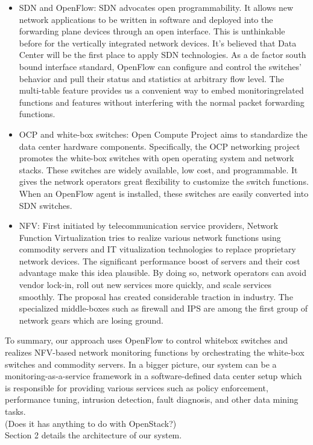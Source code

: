 \documentclass{acm_proc_article-sp}
\begin{document}
\begin{itemize}
\item SDN and OpenFlow\cite{openflow}: SDN advocates open programmability. It allows new network applications to be written in software and deployed into the forwarding plane devices through an open interface. This is unthinkable before for the vertically integrated network devices. It’s believed that Data Center will be the first place to apply SDN technologies. As a de factor south bound interface standard, OpenFlow can configure and control the switches’ behavior and pull their status and statistics at arbitrary flow level. The multi-table feature provides us a convenient way to embed monitoringrelated functions and features without interfering with the normal packet forwarding functions.
\item OCP and white-box switches\cite{ocp}: Open Compute Project aims to standardize the data center hardware components. Specifically, the OCP networking project promotes the white-box switches with open operating system and network stacks. These switches are widely available, low cost, and programmable. It gives the network operators great flexibility to customize the switch functions. When an OpenFlow agent is installed, these switches are easily converted into SDN switches.
\item NFV\cite{nfv}: First initiated by telecommunication service providers, Network Function Virtualization tries to realize various network functions using commodity servers and IT vitualization technologies to replace proprietary network devices. The significant performance boost of servers and their cost advantage make this idea plausible. By doing so, network operators can avoid vendor lock-in, roll out new services more quickly, and scale services smoothly. The proposal has created considerable traction in industry. The specialized middle-boxes such as firewall and IPS are among the first group of network gears which are losing ground.
\end{itemize}
To summary, our approach uses OpenFlow to control whitebox switches and realizes NFV-based network monitoring functions by orchestrating the white-box switches and commodity servers.
In a bigger picture, our system can be a monitoring-as-a-service framework in a software-defined data center\cite{software-} setup which is responsible for providing various services such as policy enforcement, performance tuning, intrusion detection, fault diagnosis, and other data mining tasks.\\
(Does it has anything to do with OpenStack?)\\
Section 2 details the architecture of our system.\\
\end{document}
